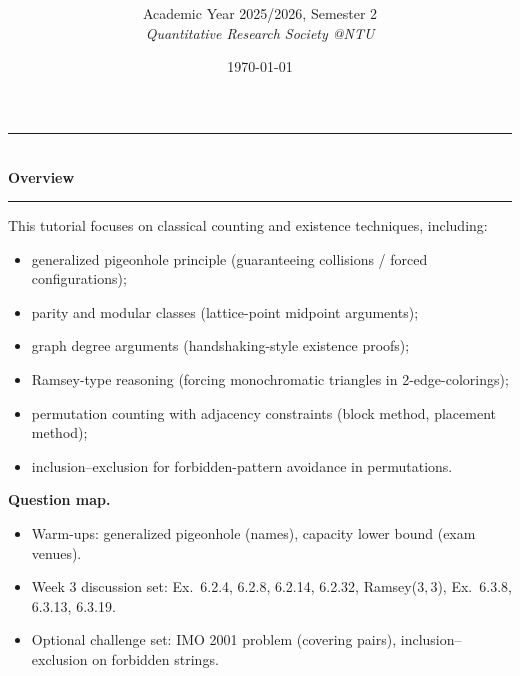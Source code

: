 \documentclass[12pt]{article}
\title{
\CourseCode \CourseName \\[0.3em]
\large \DocType
}
\author{
  Academic Year 2025/2026, Semester 2 \\[0.25em]
  \textit{Quantitative Research Society @NTU}
}
\date{\today}
\begin{document}
\maketitle
\thispagestyle{plainfirst}
\pagestyle{main}
\bigskip

\setcounter{secnumdepth}{-1} %
\setcounter{tocdepth}{3}     %


\begin{center}
  \rule{0.8\textwidth}{0.4pt}\\[4pt]
  \textbf{Overview}\\[2pt]
  \rule{0.8\textwidth}{0.4pt}
\end{center}

\noindent
This tutorial focuses on classical counting and existence techniques, including:
\begin{itemize}[leftmargin=*]
  \item generalized pigeonhole principle (guaranteeing collisions / forced configurations);
  \item parity and modular classes (lattice-point midpoint arguments);
  \item graph degree arguments (handshaking-style existence proofs);
  \item Ramsey-type reasoning (forcing monochromatic triangles in 2-edge-colorings);
  \item permutation counting with adjacency constraints (block method, placement method);
  \item inclusion--exclusion for forbidden-pattern avoidance in permutations.
\end{itemize}

\noindent
\textbf{Question map.}
\begin{itemize}[leftmargin=*]
  \item Warm-ups: generalized pigeonhole (names), capacity lower bound (exam venues).
  \item Week 3 discussion set: Ex.\ 6.2.4, 6.2.8, 6.2.14, 6.2.32, Ramsey($3,3$), Ex.\ 6.3.8, 6.3.13, 6.3.19.
  \item Optional challenge set: IMO 2001 problem (covering pairs), inclusion--exclusion on forbidden strings.
\end{itemize}
\end{document}
